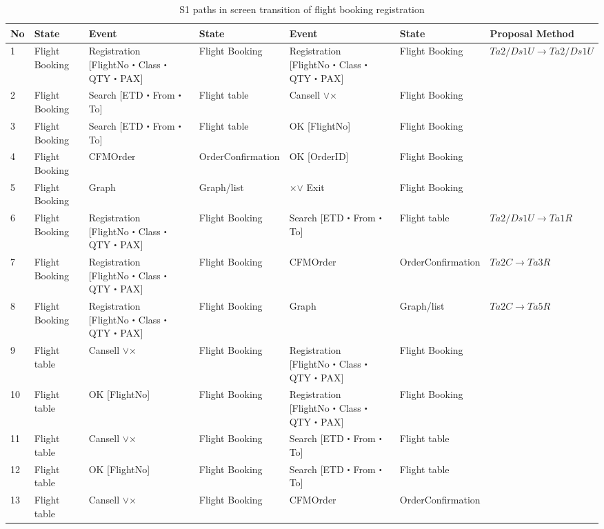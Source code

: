 \begin{table}[t]
\scriptsize
\centering
  \caption{S1 paths in screen transition of flight booking registration}
\begin{tabular}{p{1 em}|p{7 em}|p{10.5 em}|p{7 em}|p{10.5 em}|p{7 em}|p{7 em}}
    No    & State    & Event   & State    & Event    & State    &Proposal Method\\
\hline
\hline
    1     & Flight Booking  & Registration [FlightNo・Class・QTY・PAX] & Flight Booking  & Registration [FlightNo・Class・QTY・PAX] & Flight Booking  &   $Ta2/Ds1U\rightarrow Ta2/Ds1U$ \\
\hline
    2     & Flight Booking  & Search [ETD・From・To] & Flight table & Cansell $\lor$× & Flight Booking  &  \\
\hline
    3     & Flight Booking  & Search [ETD・From・To] & Flight table & OK [FlightNo] & Flight Booking  &  \\
\hline
    4     & Flight Booking  & CFMOrder & OrderConfirmation & OK [OrderID] & Flight Booking  &  \\
\hline
    5     & Flight Booking  & Graph & Graph/list & ×$\lor$ Exit & Flight Booking  &  \\
\hline
    6     & Flight Booking  & Registration [FlightNo・Class・QTY・PAX] & Flight Booking  & Search [ETD・From・To] & Flight table &   $Ta2/Ds1U \rightarrow Ta1R$ \\
\hline
    7     & Flight Booking  & Registration [FlightNo・Class・QTY・PAX] & Flight Booking  & CFMOrder & OrderConfirmation &   $Ta2C\rightarrow Ta3R$ \\
\hline
    8     & Flight Booking  & Registration [FlightNo・Class・QTY・PAX] & Flight Booking  & Graph & Graph/list &   $Ta2C\rightarrow Ta5R$ \\
\hline
    9     & Flight table & Cansell $\lor$× & Flight Booking  & Registration [FlightNo・Class・QTY・PAX] & Flight Booking  &  \\
\hline
    10    & Flight table & OK [FlightNo] & Flight Booking  & Registration [FlightNo・Class・QTY・PAX] & Flight Booking  &  \\
\hline
    11    & Flight table & Cansell $\lor$× & Flight Booking  & Search [ETD・From・To] & Flight table &  \\
\hline
    12    & Flight table & OK [FlightNo] & Flight Booking  & Search [ETD・From・To] & Flight table &  \\
\hline
    13    & Flight table & Cansell $\lor$× & Flight Booking  & CFMOrder & OrderConfirmation &  \\

\end{tabular}
\end{table}
